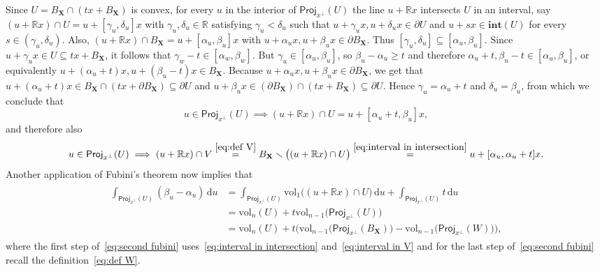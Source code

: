 \documentclass[11pt,reqno]{amsart}
\renewcommand{\ge}{\geqslant}
\renewcommand{\setminus}{\smallsetminus}
\newcommand{\ud}[0]{\,\mathrm{d}}
\newcommand{\proj}{\mathsf{Proj}}
\newcommand{\X}{\mathbf X}
\newcommand{\R}{\mathbb R}
\theoremstyle{remark}
\renewcommand{\subset}{\subseteq}
\newcommand{\vol}{\mathrm{vol}}
\renewcommand{\1}{\mathbf 1}
\begin{document}
Since $U= B_{\X}\cap (tx+B_{\X})$ is convex, for every $u$ in the interior of $\proj_{x^\perp}(U)$ the line $u+\R x$ intersects $U$ in an interval, say $(u+ \R x)\cap U=u+[\gamma_u,\delta_u]x$ with $\gamma_u,\delta_u\in \R$ satisfying $\gamma_u< \delta_u$ such that $u+\gamma_ux,u+\delta_ux\in \partial U$ and $u+s x\in \mathbf{int}(U)$ for every $s\in (\gamma_u,\delta_u)$.  Also, $(u+ \R x)\cap B_{\X}=u+[\alpha_u,\beta_u]x$ with $u+\alpha_u x,u+\beta_ux\in \partial B_{\X}$. Thus $[\gamma_u,\delta_u]\subset [\alpha_u,\beta_u]$. Since $u+\gamma_ux\in U\subset tx+B_{\X}$, it follows that $\gamma_w-t\in [\alpha_w,\beta_w]$. But  $\gamma_u\in [\alpha_u,\beta_u]$, so $\beta_u-\alpha_u\ge t$ and therefore $\alpha_u+t,\beta_u-t\in [\alpha_u,\beta_u]$, or equivalently $u+(\alpha_u+t)x,u+(\beta_u-t)x\in B_{\X}$. Because $u+\alpha_u x,u+\beta_ux\in \partial B_{\X}$, we get that $u+(\alpha_u+t)x\in B_{\X}\cap  (tx+\partial B_{\X})\subset \partial U$ and $u+\beta_ux\in (\partial B_{\X})\cap (tx+B_{\X})\subset \partial U$. Hence $\gamma_u=\alpha_u+t$ and $\delta_u=\beta_u$, from which we conclude that
\begin{equation}\label{eq:interval in intersection}
u\in \proj_{x^\perp}(U)\implies (u+ \R x)\cap U=u+[\alpha_u+t,\beta_u]x,
\end{equation}
and therefore also
\begin{equation}\label{eq:interval in V}
u\in \proj_{x^\perp}(U)\implies (u+ \R x)\cap V\stackrel{\eqref{eq:def V}}{=}B_{\X}\setminus \big((u+ \R x)\cap U\big)\stackrel{\eqref{eq:interval in intersection}}{=}u+[\alpha_u,\alpha_u+t]x.
\end{equation}
Another application of Fubini's theorem now implies that
\begin{align}\label{eq:second fubini}
\begin{split}
\int_{\proj_{x^{\perp}} (U)} (\beta_u-\alpha_u)\ud u &=\int_{\proj_{x^{\perp}} (U)} \vol_1\big((u+ \R x)\cap U\big)\ud u+\int_{\proj_{x^{\perp}} (U)} t\ud u
\\&=\vol_n(U)+t\vol_{n-1}\big(\proj_{x^{\perp}} (U)\big) \\&=\vol_n(U)+t\Big(\vol_{n-1}\big(\proj_{x^{\perp}} (B_{\X})\big)-\vol_{n-1}\big(\proj_{x^{\perp}} (W)\big)\Big),
\end{split}
\end{align}
where the first step of~\eqref{eq:second fubini} uses~\eqref{eq:interval in intersection} and~\eqref{eq:interval in V} and for the last step of~\eqref{eq:second fubini} recall the definition~\eqref{eq:def W}.
\end{document}
